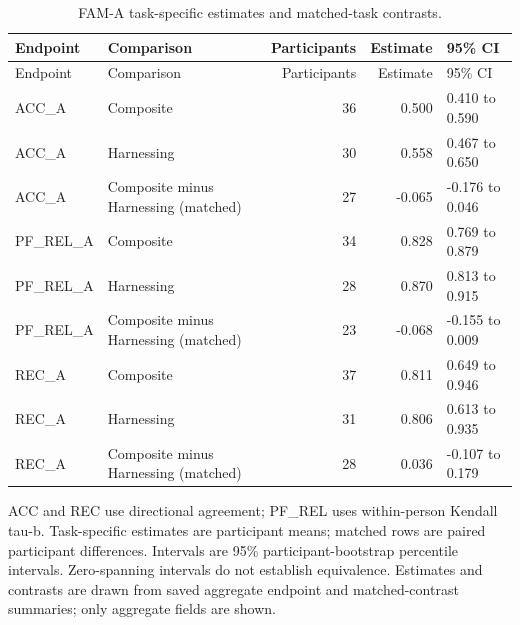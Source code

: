 \begingroup
\scriptsize
\setlength{\tabcolsep}{3pt}
\begin{longtable}{p{2cm}p{5.2cm}r r p{3cm}}
\caption{FAM-A task-specific estimates and matched-task contrasts.}\label{tab:S2}\\
\toprule
Endpoint & Comparison & Participants & Estimate & 95\% CI \\
\midrule\endfirsthead
\toprule
Endpoint & Comparison & Participants & Estimate & 95\% CI \\
\midrule\endhead
ACC\_A & Composite & 36 & 0.500 & 0.410 to 0.590 \\
ACC\_A & Harnessing & 30 & 0.558 & 0.467 to 0.650 \\
ACC\_A & Composite minus Harnessing (matched) & 27 & -0.065 & -0.176 to 0.046 \\
PF\_REL\_A & Composite & 34 & 0.828 & 0.769 to 0.879 \\
PF\_REL\_A & Harnessing & 28 & 0.870 & 0.813 to 0.915 \\
PF\_REL\_A & Composite minus Harnessing (matched) & 23 & -0.068 & -0.155 to 0.009 \\
REC\_A & Composite & 37 & 0.811 & 0.649 to 0.946 \\
REC\_A & Harnessing & 31 & 0.806 & 0.613 to 0.935 \\
REC\_A & Composite minus Harnessing (matched) & 28 & 0.036 & -0.107 to 0.179 \\
\bottomrule
\end{longtable}
\noindent\footnotesize ACC and REC use directional agreement; PF\_REL uses within-person Kendall tau-b. Task-specific estimates are participant means; matched rows are paired participant differences. Intervals are 95\% participant-bootstrap percentile intervals. Zero-spanning intervals do not establish equivalence. Estimates and contrasts are drawn from saved aggregate endpoint and matched-contrast summaries; only aggregate fields are shown.
\endgroup

